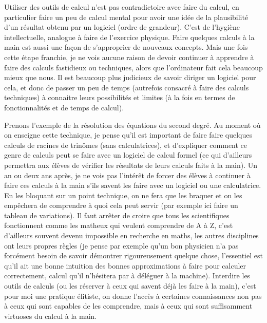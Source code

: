 \documentclass[a4paper,11pt]{article}
\begin{document}
Utiliser des outils de calcul n'est pas contradictoire avec faire
du calcul, en particulier faire un peu de calcul mental pour avoir
une id\'ee de la plausibilit\'e d'un r\'esultat obtenu par
un logiciel (ordre de grandeur). C'est
de l'hygi\`ene intellectuelle, analogue \`a faire de l'exercice
physique. Faire quelques calculs \`a la main est aussi une
fa\c{c}on de s'approprier de nouveaux concepts. Mais une fois
cette \'etape franchie, je ne vois aucune raison de devoir
continuer \`a apprendre \`a faire des calculs fastidieux
ou techniques, alors que l'ordinateur fait cela beaucoup mieux
que nous. Il est beaucoup plus judicieux de savoir diriger
un logiciel pour cela, et donc de passer un peu de temps
(autrefois consacr\'e \`a faire des calculs techniques)
\`a connaitre leurs possibilit\'es
et limites (\`a la fois en termes de fonctionnalit\'es et
de temps de calcul).

Prenons l'exemple de la r\'esolution des \'equations du second
degr\'e. Au moment o\`u on enseigne cette technique, je pense
qu'il est important de faire faire quelques calculs de racines 
de trin\^omes (sans
calculatrices), et d'expliquer comment ce genre de calculs peut
se faire avec un logiciel de calcul formel (ce qui d'ailleurs
permettra aux \'el\`eves de v\'erifier les r\'esultats
de leurs calculs faits \`a la main).
Un an ou deux ans apr\`es, je ne vois pas l'int\'er\^et de forcer
des \'el\`eves \`a continuer \`a faire ces calculs \`a la main
s'ils savent les faire avec un logiciel ou une calculatrice. En les
bloquant sur un point technique, on ne fera
que les braquer et on les emp\^echera de comprendre \`a quoi
cela peut servir (par exemple ici faire un tableau de variations).
Il faut arr\^eter de croire que tous les
scientifiques fonctionnent comme les matheux qui veulent
comprendre de A \`a Z, c'est d'ailleurs souvent devenu
impossible en recherche en maths, les autres disciplines
ont leurs propres r\`egles (je pense par exemple qu'un
bon physicien n'a pas forc\'ement besoin de savoir
d\'emontrer rigoureusement quelque chose, l'essentiel
est qu'il ait une bonne intuition des bonnes approximations
\`a faire pour calculer correctement, calcul qu'il n'h\'esitera
par \`a d\'el\'eguer \`a la machine). Interdire les outils
de calculs (ou les r\'eserver \`a ceux qui savent d\'ej\`a
les faire \`a la main), c'est pour moi une pratique \'elitiste,
on donne l'acc\`es \`a certaines connaissances non pas
\`a ceux qui sont capables de les comprendre, mais \`a
ceux qui sont suffisamment virtuoses du calcul \`a la main.
\end{document}
